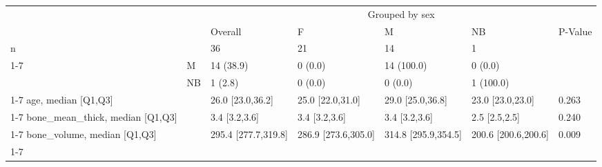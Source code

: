 \begin{tabular}{lllllll}
\toprule
 &  & \multicolumn{5}{c}{Grouped by sex} \\
 &  & Overall & F & M & NB & P-Value \\
\midrule
n &  & 36 & 21 & 14 & 1 &  \\
\cline{1-7}
\multirow[t]{3}{*}{sex, n (%
 & M & 14 (38.9) & 0 (0.0) & 14 (100.0) & 0 (0.0) &  \\
 & NB & 1 (2.8) & 0 (0.0) & 0 (0.0) & 1 (100.0) &  \\
\cline{1-7}
age, median [Q1,Q3] &  & 26.0 [23.0,36.2] & 25.0 [22.0,31.0] & 29.0 [25.0,36.8] & 23.0 [23.0,23.0] & 0.263 \\
\cline{1-7}
bone_mean_thick, median [Q1,Q3] &  & 3.4 [3.2,3.6] & 3.4 [3.2,3.6] & 3.4 [3.2,3.6] & 2.5 [2.5,2.5] & 0.240 \\
\cline{1-7}
bone_volume, median [Q1,Q3] &  & 295.4 [277.7,319.8] & 286.9 [273.6,305.0] & 314.8 [295.9,354.5] & 200.6 [200.6,200.6] & 0.009 \\
\cline{1-7}
\bottomrule
\end{tabular}
